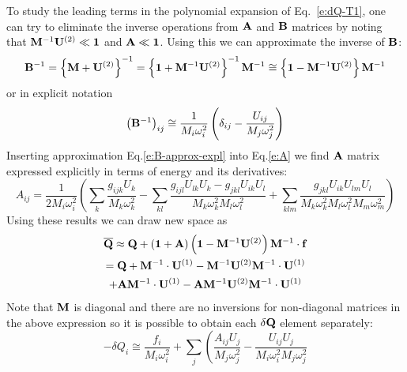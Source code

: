 \documentclass[b5paper,oneside,fleqn,11pt]{book}
\begin{document}
\begin{refsection}
To study the leading terms in the polynomial expansion of Eq.~\eqref{e:dQ-T1}, 
one can try to eliminate the inverse operations from ${\bf A}$ and ${\bf B}$ matrices by noting that
${\bf M}^{-1} {\bf U}^{(2)} \ll {\bf 1}$ and ${\bf A} \ll {\bf 1}$. 
Using this we can approximate the inverse of ${\bf B}$:
%
\begin{equation}\label{e:B-approx}
{\bf B}^{-1} = \left\{ {\bf M} + {\bf U}^{(2)} \right\}^{-1} 
= \left\{ {\bf 1} + {\bf M}^{-1}{\bf U}^{(2)} \right\}^{-1}{\bf M}^{-1}
\cong \left\{ {\bf 1} - {\bf M}^{-1}{\bf U}^{(2)} \right\}{\bf M}^{-1}
\end{equation}
%
or in explicit notation
%
\begin{equation}\label{e:B-approx-expl}
\left( {\bf B}^{-1} \right)_{ij} \cong
\frac{1}{M_i\omega_i^2} \left( \delta_{ij} - \frac{U_{ij}}{M_j\omega_j^2} \right)
\end{equation}
%
Inserting approximation Eq.\eqref{e:B-approx-expl} into Eq.\eqref{e:A} we find
${\bf A}$ matrix expressed explicitly in terms of energy and its derivatives:
%
\begin{equation}\label{e:A-approx-expl}
A_{ij} = \frac{1}{2M_i\omega_i^2} 
\left(
     \sum_k \frac{g_{ijk}U_k}{M_k\omega_k^2} -
     \sum_{kl} \frac{ g_{ijl} U_{lk} U_k - g_{jkl} U_{ik} U_l }
                    {M_k\omega_k^2 M_l\omega_l^2} +
     \sum_{klm} \frac{ g_{jkl} U_{ik} U_{lm} U_l }
                     {M_k\omega_k^2 M_l\omega_l^2 M_m\omega_m^2}
\right)
\end{equation}
%
Using these results we can draw new space as
\begin{multline}\label{e:Q-new-T2-approx}
{\bf \overline{Q}} \approx {\bf Q} + \left( {\bf 1} + {\bf A} \right) \left( {\bf 1} - {\bf M}^{-1}{\bf U}^{(2)} \right){\bf M}^{-1} \cdot {\bf f}
 \\
={\bf Q} + {\bf M}^{-1} \cdot {\bf U}^{(1)} - {\bf M}^{-1}{\bf U}^{(2)}{\bf M}^{-1}\cdot{\bf U}^{(1)}
\\
+ {\bf A}{\bf M}^{-1}\cdot{\bf U}^{(1)} - {\bf A}{\bf M}^{-1}{\bf U}^{(2)}{\bf M}^{-1}\cdot{\bf U}^{(1)}
\end{multline}
%
Note that ${\bf M}$ is diagonal and there are no inversions 
for non-diagonal matrices in the above expression
so it is possible to obtain each $\delta{\bf Q}$
element separately:
%
\begin{equation}\label{e:dQ-approx-T1-expl}
-\delta Q_i \cong \frac{f_i}{M_i\omega_i^2} + 
  \sum_j \left( 
         \frac{ A_{ij}U_j }{M_j\omega_j^2} - 
         \frac{ U_{ij}U_j }{M_i\omega_i^2 M_j\omega_j^2}

\end{equation}
\end{refsection}
\end{document}

